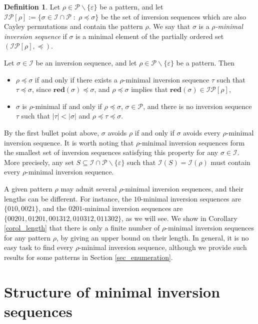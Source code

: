 \documentclass[a4paper,11pt]{article}
\theoremstyle{definition}
\newtheorem{defn}[thm]{Definition}
\theoremstyle{remark}
\newcommand{\I}{\mathcal{I}}
\renewcommand{\P}{\mathcal{P}}
\newcommand{\red}{\mathbf{red}}
\begin{document}
\begin{defn}
Let $\rho \in \P \backslash \{\varepsilon\}$ be a pattern, and let $\I\P[\rho] := \{\sigma \in \I \cap \P \; : \; \rho \preceq \sigma\}$ be the set of inversion sequences which are also Cayley permutations and contain the pattern $\rho$. We say that $\sigma$ is a \emph{$\rho$-minimal inversion sequence} if $\sigma$ is a minimal element of the partially ordered set $(\I\P[\rho], \preceq)$.
\end{defn}

Let $\sigma \in \I$ be an inversion sequence, and let $\rho \in \P \backslash \{\varepsilon\}$ be a pattern. Then
\begin{itemize}
    \item $\rho \preceq \sigma$ if and only if there exists a $\rho$-minimal inversion sequence $\tau$ such that $\tau \preceq \sigma$, since $\red(\sigma) \preceq \sigma$, and $\rho \preceq \sigma$ implies that $\red(\sigma) \in \I\P[\rho]$,
    \item $\sigma$ is $\rho$-minimal if and only if $\rho \preceq \sigma$, $\sigma \in \P$, and there is no inversion sequence $\tau$ such that $|\tau| < |\sigma|$ and $\rho \preceq \tau \preceq \sigma$.
\end{itemize}
By the first bullet point above, $\sigma$ avoids $\rho$ if and only if $\sigma$ avoids every $\rho$-minimal inversion sequence. It is worth noting that $\rho$-minimal inversion sequences form the smallest set of inversion sequences satisfying this property for any $\sigma \in \I$. More precisely, any set $S \subseteq \I \cap \P \backslash \{\varepsilon\}$ such that $\I(S) = \I(\rho)$ must contain every $\rho$-minimal inversion sequence.

A given pattern $\rho$ may admit several $\rho$-minimal inversion sequences, and their lengths can be different. For instance, the $10$-minimal inversion sequences are $\{010, 0021\}$, and the $0201$-minimal inversion sequences are $\{00201, 01201, 001312, 010312, 011302\}$, as we will see. We show in Corollary \ref{corol_length} that there is only a finite number of $\rho$-minimal inversion sequences for any pattern $\rho$, by giving an upper bound on their length. In general, it is no easy task to find every $\rho$-minimal inversion sequence, although we provide such results for some patterns in Section \ref{sec_enumeration}.

\section{Structure of minimal inversion sequences} \label{sec_structure}
\end{document}
